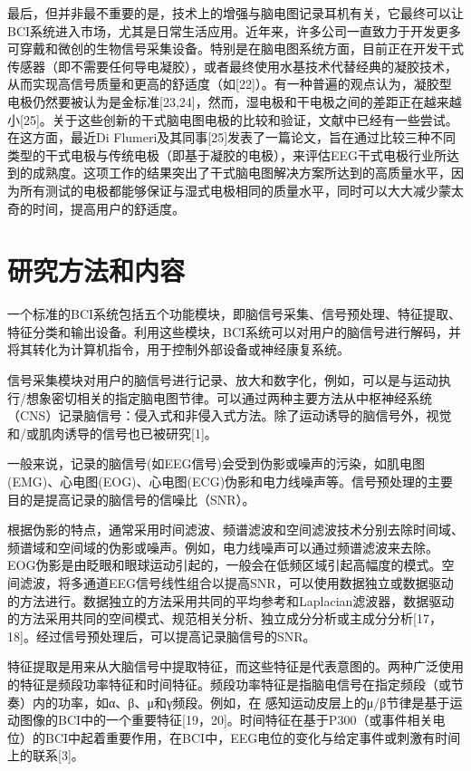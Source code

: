 \documentclass[UTF8,a4paper]{ctexart}
\begin{document}
\par
最后，但并非最不重要的是，技术上的增强与脑电图记录耳机有关，它最终可以让BCI系统进入市场，尤其是日常生活应用。近年来，许多公司一直致力于开发更多可穿戴和微创的生物信号采集设备。特别是在脑电图系统方面，目前正在开发干式传感器（即不需要任何导电凝胶），或者最终使用水基技术代替经典的凝胶技术，从而实现高信号质量和更高的舒适度（如[22]）。有一种普遍的观点认为，凝胶型电极仍然要被认为是金标准[23,24]，然而，湿电极和干电极之间的差距正在越来越小[25]。关于这些创新的干式脑电图电极的比较和验证，文献中已经有一些尝试。在这方面，最近Di Flumeri及其同事[25]发表了一篇论文，旨在通过比较三种不同类型的干式电极与传统电极（即基于凝胶的电极），来评估EEG干式电极行业所达到的成熟度。这项工作的结果突出了干式脑电图解决方案所达到的高质量水平，因为所有测试的电极都能够保证与湿式电极相同的质量水平，同时可以大大减少蒙太奇的时间，提高用户的舒适度。
\section{研究方法和内容}
一个标准的BCI系统包括五个功能模块，即脑信号采集、信号预处理、特征提取、特征分类和输出设备。利用这些模块，BCI系统可以对用户的脑信号进行解码，并将其转化为计算机指令，用于控制外部设备或神经康复系统。
\par
信号采集模块对用户的脑信号进行记录、放大和数字化，例如，可以是与运动执行/想象密切相关的指定脑电图节律。可以通过两种主要方法从中枢神经系统（CNS）记录脑信号：侵入式和非侵入式方法。除了运动诱导的脑信号外，视觉和/或肌肉诱导的信号也已被研究[1]。
\par
一般来说，记录的脑信号(如EEG信号)会受到伪影或噪声的污染，如肌电图(EMG)、心电图(EOG)、心电图(ECG)伪影和电力线噪声等。信号预处理的主要目的是提高记录的脑信号的信噪比（SNR）。
\par
根据伪影的特点，通常采用时间滤波、频谱滤波和空间滤波技术分别去除时间域、频谱域和空间域的伪影或噪声。例如，电力线噪声可以通过频谱滤波来去除。EOG伪影是由眨眼和眼球运动引起的，一般会在低频区域引起高幅度的模式。空间滤波，将多通道EEG信号线性组合以提高SNR，可以使用数据独立或数据驱动的方法进行。数据独立的方法采用共同的平均参考和Laplacian滤波器，数据驱动的方法采用共同的空间模式、规范相关分析、独立成分分析或主成分分析[17，18]。经过信号预处理后，可以提高记录脑信号的SNR。
\par
特征提取是用来从大脑信号中提取特征，而这些特征是代表意图的。两种广泛使用的特征是频段功率特征和时间特征。频段功率特征是指脑电信号在指定频段（或节奏）内的功率，如α、β、μ和γ频段。例如，在
感知运动皮层上的μ/β节律是基于运动图像的BCI中的一个重要特征[19，20]。时间特征在基于P300（或事件相关电位）的BCI中起着重要作用，在BCI中，EEG电位的变化与给定事件或刺激有时间上的联系[3]。
\end{document}
